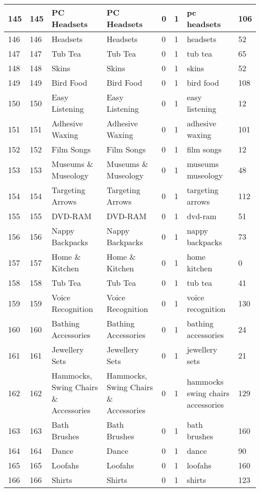 \begin{longtable}{|l|l|l|l|l|l|l|l|}
145 & 145 & PC Headsets & PC Headsets & 0 & 1 & pc headsets & 106 \\ \hline 
146 & 146 & Headsets & Headsets & 0 & 1 & headsets & 52 \\ \hline 
147 & 147 & Tub Tea & Tub Tea & 0 & 1 & tub tea & 65 \\ \hline 
148 & 148 & Skins & Skins & 0 & 1 & skins & 52 \\ \hline 
149 & 149 & Bird Food & Bird Food & 0 & 1 & bird food & 108 \\ \hline 
150 & 150 & Easy Listening & Easy Listening & 0 & 1 & easy listening & 12 \\ \hline 
151 & 151 & Adhesive Waxing & Adhesive Waxing & 0 & 1 & adhesive waxing & 101 \\ \hline 
152 & 152 & Film Songs & Film Songs & 0 & 1 & film songs & 12 \\ \hline 
153 & 153 & Museums \& Museology & Museums \& Museology & 0 & 1 & museums museology & 48 \\ \hline 
154 & 154 & Targeting Arrows & Targeting Arrows & 0 & 1 & targeting arrows & 112 \\ \hline 
155 & 155 & DVD-RAM & DVD-RAM & 0 & 1 & dvd-ram & 51 \\ \hline 
156 & 156 & Nappy Backpacks & Nappy Backpacks & 0 & 1 & nappy backpacks & 73 \\ \hline 
157 & 157 & Home \& Kitchen & Home \& Kitchen & 0 & 1 & home kitchen & 0 \\ \hline 
158 & 158 & Tub Tea & Tub Tea & 0 & 1 & tub tea & 41 \\ \hline 
159 & 159 & Voice Recognition & Voice Recognition & 0 & 1 & voice recognition & 130 \\ \hline 
160 & 160 & Bathing Accessories & Bathing Accessories & 0 & 1 & bathing accessories & 24 \\ \hline 
161 & 161 & Jewellery Sets & Jewellery Sets & 0 & 1 & jewellery sets & 21 \\ \hline 
162 & 162 & Hammocks, Swing Chairs \& Accessories & Hammocks, Swing Chairs \& Accessories & 0 & 1 & hammocks swing chairs accessories & 129 \\ \hline 
163 & 163 & Bath Brushes & Bath Brushes & 0 & 1 & bath brushes & 160 \\ \hline 
164 & 164 & Dance & Dance & 0 & 1 & dance & 90 \\ \hline 
165 & 165 & Loofahs & Loofahs & 0 & 1 & loofahs & 160 \\ \hline 
166 & 166 & Shirts & Shirts & 0 & 1 & shirts & 123 \\ \hline 

\end{longtable}
